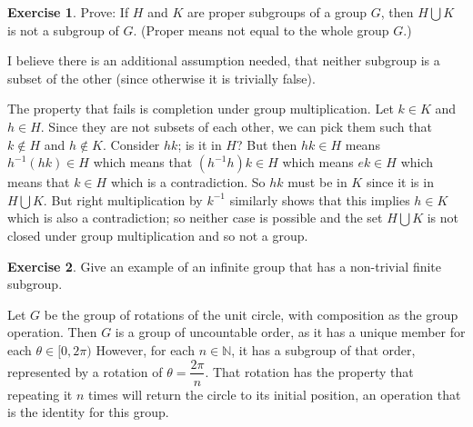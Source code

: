 \documentclass[11pt,oneside]{article}
\numberwithin{equation}{section}
\theoremstyle{definition}
\newtheorem{exercise}{Exercise}
\def\NN{\mathbb{N}}
\begin{document}
\begin{solution}
\begin{enumerate}[(1)]
\begin{enumerate}[(a)]
\end{enumerate}

\end{enumerate}
\end{solution}

\begin{exercise}
  Prove: If $H$ and $K$ are proper subgroups of a group $G$, then $H
  \bigcup K $ is not a subgroup of $G$.  (Proper means not equal to
  the whole group $G$.)
\end{exercise}

\begin{solution}

  I believe there is an additional assumption needed, that neither
  subgroup is a subset of the other (since otherwise it is trivially
  false).
  
  The property that fails is completion under group multiplication.
  Let $k \in K$ and $ h \in H$. Since they are not subsets of each
  other, we can pick them such that $ k \notin H$ and $h \notin K$.
  Consider $h k$; is it in $H$?  But then $ h k \in H $ means $ h ^
  {-1} ( h k ) \in H$ which means that $ ( h ^ { -1 } h ) k \in H $
  which means $ e k \in H $ which means that $ k \in H $ which is a
  contradiction.  So $ h k $ must be in $K$ since it is in $ H \bigcup  K $.
  But right multiplication by $ k ^ { -1 } $ similarly shows
  that this implies $ h \in K $ which is also a contradiction; so
  neither case is possible and the set $ H \bigcup K $ is not closed
  under group multiplication and so not a group.

\end{solution}


\begin{exercise}
  Give an example of an infinite group that has a non-trivial finite subgroup.  
\end{exercise}

\begin{solution}
  Let $G$ be the group of rotations of the unit circle, with
  composition as the group operation.  Then $G$ is a group of
  uncountable order, as it has a unique member for each $ \theta \in [
    0, 2 \pi ) $ However, for each $ n \in \NN$, it has a
    subgroup of that order, represented by a rotation of $ \theta = \dfrac{2 \pi}{n}$.
    That rotation has the property that repeating
    it $n$ times will return the circle to its initial position, an
    operation that is the identity for this group.
\end{solution}
\end{document}
